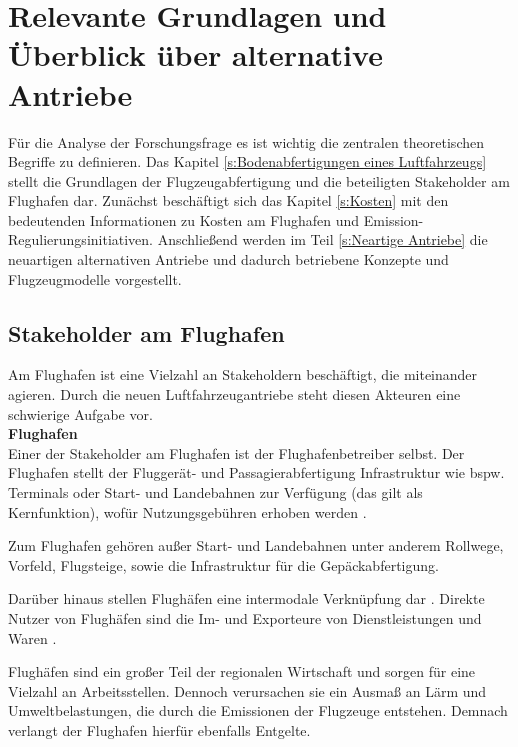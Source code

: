 \chapter{Relevante Grundlagen und Überblick über alternative Antriebe}
\label{ch:Relevante Grundlagen und Überblick über alternative Antriebe}
Für die Analyse der Forschungsfrage es ist wichtig die zentralen theoretischen Begriffe zu definieren. 
Das Kapitel \ref{s:Bodenabfertigungen eines Luftfahrzeugs} stellt die Grundlagen der Flugzeugabfertigung und 
die beteiligten Stakeholder am Flughafen dar. Zunächst beschäftigt sich das Kapitel \ref{s:Kosten}
mit den bedeutenden Informationen zu Kosten am Flughafen und Emission-Regulierungsinitiativen. 
Anschließend werden im Teil \ref{s:Neartige Antriebe}
die neuartigen alternativen Antriebe und dadurch betriebene Konzepte und Flugzeugmodelle vorgestellt.

\section{Stakeholder am Flughafen}
\label{s:Stakeholder am Flughafen}

Am Flughafen ist eine Vielzahl an Stakeholdern beschäftigt, die miteinander agieren. 
Durch die neuen Luftfahrzeugantriebe steht diesen Akteuren eine 
schwierige Aufgabe vor.\\

\textbf{Flughafen} \\
Einer der Stakeholder am Flughafen ist der Flughafenbetreiber selbst. 
Der Flughafen stellt der Fluggerät- und Passagierabfertigung Infrastruktur wie bspw. Terminals oder Start- und Landebahnen zur Verfügung (das gilt als Kernfunktion), 
wofür Nutzungsgebühren erhoben werden \cite{conrady2019luftverkehr}. %

Zum Flughafen gehören außer Start- und Landebahnen unter anderem Rollwege, Vorfeld, Flugsteige, sowie die Infrastruktur für die Gepäckabfertigung. 

Darüber hinaus stellen Flughäfen eine intermodale Verknüpfung dar \cite{conrady2019luftverkehr}. %
Direkte Nutzer von Flughäfen sind die Im- und Exporteure von Dienstleistungen und Waren \cite{schaar2010analysis}. 

Flughäfen sind ein großer Teil der regionalen Wirtschaft \cite{schaar2010analysis} und sorgen für eine Vielzahl an Arbeitsstellen. 
Dennoch verursachen sie ein Ausmaß an Lärm und Umweltbelastungen, die durch die Emissionen der Flugzeuge entstehen.
Demnach verlangt der Flughafen hierfür ebenfalls Entgelte. \\ %

